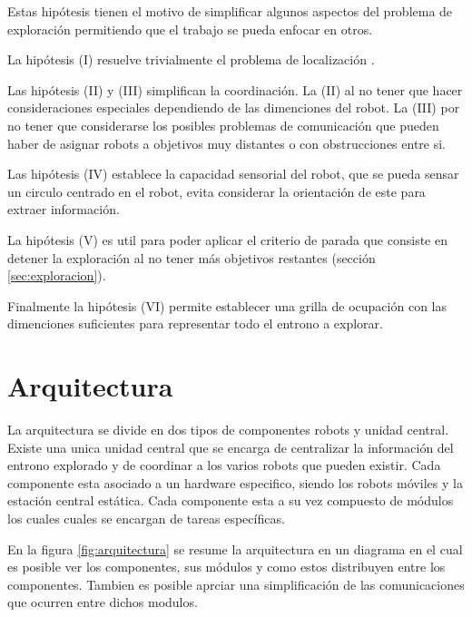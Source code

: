 
Estas hipótesis tienen el motivo de simplificar algunos aspectos del
problema de exploración permitiendo que el trabajo se pueda enfocar en otros.

La hipótesis (I) resuelve trivialmente el problema de localización \cite{slam}. 

Las hipótesis (II) y (III) simplifican la coordinación. La (II) al no tener que hacer
consideraciones especiales dependiendo de las dimenciones del robot. La (III) por
no tener que considerarse los posibles problemas de comunicación que pueden
haber de asignar robots a objetivos muy distantes o con obstrucciones entre si. 

Las hipótesis (IV) establece la capacidad sensorial del robot, que se pueda
sensar un circulo centrado en el robot, evita considerar la orientación de este
para extraer información.

La hipótesis (V) es util para poder aplicar el criterio de parada que consiste
en detener la exploración al no tener más objetivos restantes (sección
\ref{sec:exploracion}). 

Finalmente la hipótesis (VI) permite establecer una grilla de ocupación con las
dimenciones suficientes para representar todo el entrono a explorar. 

\section{Arquitectura}\label{sec:arqui}
La arquitectura se divide en dos tipos de componentes robots y unidad central.
Existe una unica unidad central que se encarga de centralizar la información
del entrono explorado y de coordinar a los varios robots que pueden existir.
Cada componente esta asociado a un hardware especifico, siendo los robots móviles
y la estación central estática. 
Cada componente esta a su vez compuesto de módulos los cuales cuales se
encargan de tareas específicas. 

En la figura \ref{fig:arquitectura} se resume la arquitectura en un diagrama en
el cual es posible ver los componentes, sus módulos y como estos distribuyen
entre los componentes. Tambien es posible aprciar una simplificación de las
comunicaciones que ocurren entre dichos modulos.


